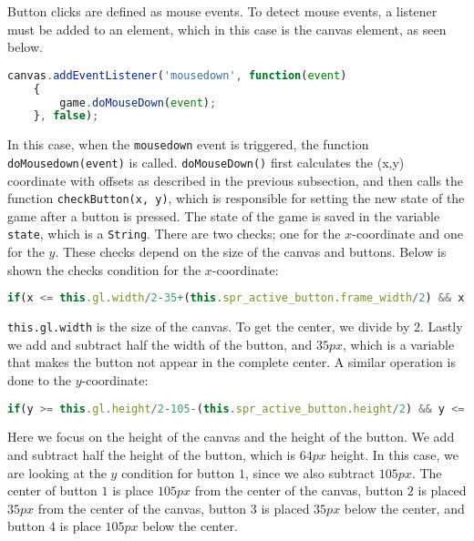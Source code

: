 Button clicks are defined as mouse events. To detect mouse events, a listener must be added to an element, which in this case is the canvas element, as seen below.

\begin{lstlisting}[language=JavaScript, caption=Add event listener to canvas]
canvas.addEventListener('mousedown', function(event)
	{
		game.doMouseDown(event);
	}, false);
\end{lstlisting}

In this case, when the \verb|mousedown| event is triggered, the function\\
\verb|doMousedown(event)| is called. \verb|doMouseDown()| first calculates the (x,y) coordinate with offsets as described in the previous subsection, and then calls the function \verb|checkButton(x, y)|, which is responsible for setting the new state of the game after a button is pressed. The state of the game is saved in the variable \verb|state|, which is a \verb|String|. There are two checks; one for the $x$-coordinate and one for the $y$. These checks depend on the size of the canvas and buttons. Below is shown the checks condition for the $x$-coordinate:

\begin{lstlisting}[language=JavaScript, caption=x condition check for menu buttons]
if(x <= this.gl.width/2-35+(this.spr_active_button.frame_width/2) && x >= this.gl.width/2-35-(this.spr_active_button.frame_width/2)){...}
\end{lstlisting}

\verb|this.gl.width| is the size of the canvas. To get the center, we divide by 2. Lastly we add and subtract half the width of the button, and $35px$, which is a variable that makes the button not appear in the complete center. A similar operation is done to the $y$-coordinate:

\begin{lstlisting}[language=JavaScript, caption=y condition check for menu buttons]
if(y >= this.gl.height/2-105-(this.spr_active_button.height/2) && y <= this.gl.height/2-105+(this.spr_active_button.frame_height/2)){...}
\end{lstlisting}

Here we focus on the height of the canvas and the height of the button. We add and subtract half the height of the button, which is $64px$ height. In this case, we are looking at the $y$ condition for button $1$, since we also subtract $105px$. The center of button $1$ is place $105px$ from the center of the canvas, button $2$ is placed $35px$ from the center of the canvas, button $3$ is placed $35px$ below the center, and button $4$ is place $105px$ below the center.\\

